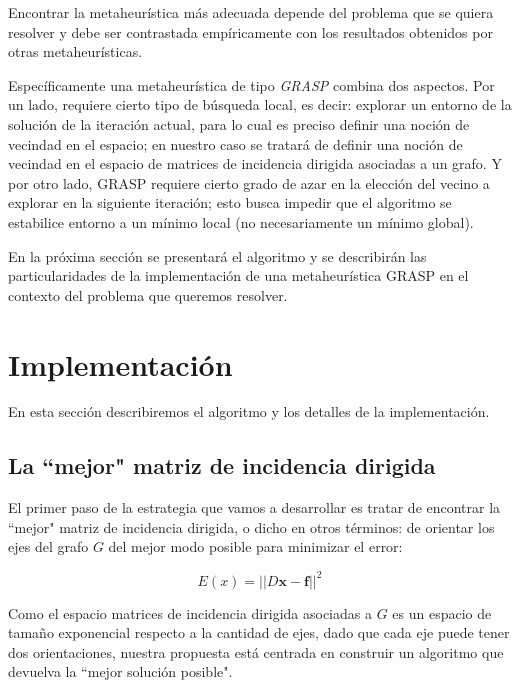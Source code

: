 \documentclass[10pt, a4paper, twocolumn]{article} %
\begin{document}
Encontrar la metaheurística más adecuada depende del problema que se 
quiera resolver y debe ser contrastada empíricamente con los resultados 
obtenidos por otras metaheurísticas.

\smallskip

Específicamente una metaheurística de tipo \textit{GRASP} combina dos 
aspectos. Por un lado, requiere cierto tipo de búsqueda local, es decir: 
explorar un entorno de la solución de la iteración actual, para lo cual 
es preciso definir una noción de vecindad en el espacio; en nuestro caso 
se tratará de definir una noción de vecindad en el espacio de matrices 
de incidencia dirigida asociadas a un grafo. Y por otro lado, GRASP 
requiere cierto grado de azar en la elección del vecino a explorar en 
la siguiente iteración; esto busca impedir que el algoritmo se 
estabilice entorno a un mínimo local (no necesariamente un mínimo 
global). 

\smallskip

En la próxima sección se presentará el algoritmo y se describirán las 
particularidades de la implementación de una metaheurística GRASP en el 
contexto del problema que queremos resolver.

\section{Implementación}

En esta sección describiremos el algoritmo y los detalles de la 
implementación.

\subsection{La ``mejor" matriz de incidencia dirigida}

El primer paso de la estrategia que vamos a desarrollar es tratar de 
encontrar la ``mejor" matriz de incidencia dirigida, o dicho en otros 
términos: de orientar los ejes del grafo $G$ del mejor modo posible para 
minimizar el error:

$$E(x) = ||D\bm{x}-\bm{f}||^2$$
 
Como el espacio matrices de incidencia dirigida asociadas a $G$ es un 
espacio de tamaño exponencial respecto a la cantidad de ejes, dado que 
cada eje puede tener dos orientaciones, nuestra propuesta está centrada 
en construir un algoritmo que devuelva la ``mejor solución posible".

\bigskip

\end{document}
